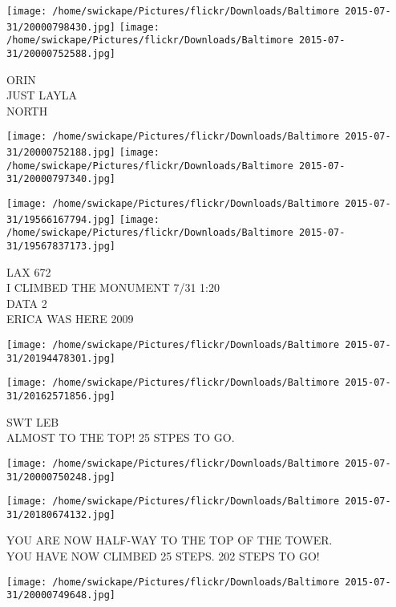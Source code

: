 \documentclass[10pt,letterpaper]{article}
\begin{document}
\vspace{0.25in}
\texttt{[image: /home/swickape/Pictures/flickr/Downloads/Baltimore 2015-07-31/20000798430.jpg]}
\texttt{[image: /home/swickape/Pictures/flickr/Downloads/Baltimore 2015-07-31/20000752588.jpg]}

ORIN\\
JUST LAYLA\\
NORTH\\
\pagebreak

\texttt{[image: /home/swickape/Pictures/flickr/Downloads/Baltimore 2015-07-31/20000752188.jpg]}
\texttt{[image: /home/swickape/Pictures/flickr/Downloads/Baltimore 2015-07-31/20000797340.jpg]}

\texttt{[image: /home/swickape/Pictures/flickr/Downloads/Baltimore 2015-07-31/19566167794.jpg]}
\texttt{[image: /home/swickape/Pictures/flickr/Downloads/Baltimore 2015-07-31/19567837173.jpg]}

LAX 672\\
I CLIMBED THE MONUMENT 7/31 1:20\\
DATA 2\\
ERICA WAS HERE 2009\\
\pagebreak

\texttt{[image: /home/swickape/Pictures/flickr/Downloads/Baltimore 2015-07-31/20194478301.jpg]}

\vspace{0.25in}
\texttt{[image: /home/swickape/Pictures/flickr/Downloads/Baltimore 2015-07-31/20162571856.jpg]}

SWT LEB\\
ALMOST TO THE TOP!  25 STPES TO GO.\\
\pagebreak

\texttt{[image: /home/swickape/Pictures/flickr/Downloads/Baltimore 2015-07-31/20000750248.jpg]}

\vspace{0.25in}
\texttt{[image: /home/swickape/Pictures/flickr/Downloads/Baltimore 2015-07-31/20180674132.jpg]}

YOU ARE NOW HALF{-}WAY TO THE TOP OF THE TOWER.\\
YOU HAVE NOW CLIMBED 25 STEPS.  202 STEPS TO GO!\\
\pagebreak

\texttt{[image: /home/swickape/Pictures/flickr/Downloads/Baltimore 2015-07-31/20000749648.jpg]}
\end{document}
